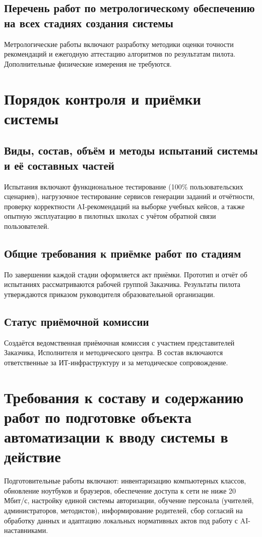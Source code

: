 \documentclass[14pt,a4paper]{extarticle}
\begin{document}
\subsection{Перечень работ по метрологическому обеспечению на всех стадиях создания системы}
Метрологические работы включают разработку методики оценки точности рекомендаций и ежегодную аттестацию алгоритмов по результатам пилота. Дополнительные физические измерения не требуются.

\section{Порядок контроля и приёмки системы}
\subsection{Виды, состав, объём и методы испытаний системы и её составных частей}
Испытания включают функциональное тестирование (100\% пользовательских сценариев), нагрузочное тестирование сервисов генерации заданий и отчётности, проверку корректности AI-рекомендаций на выборке учебных кейсов, а также опытную эксплуатацию в пилотных школах с учётом обратной связи пользователей.

\subsection{Общие требования к приёмке работ по стадиям}
По завершении каждой стадии оформляется акт приёмки. Прототип и отчёт об испытаниях рассматриваются рабочей группой Заказчика. Результаты пилота утверждаются приказом руководителя образовательной организации.

\subsection{Статус приёмочной комиссии}
Создаётся ведомственная приёмочная комиссия с участием представителей Заказчика, Исполнителя и методического центра. В состав включаются ответственные за ИТ-инфраструктуру и за методическое сопровождение.

\section{Требования к составу и содержанию работ по подготовке объекта автоматизации к вводу системы в действие}
Подготовительные работы включают: инвентаризацию компьютерных классов, обновление ноутбуков и браузеров, обеспечение доступа к сети не ниже 20 Мбит/с, настройку единой системы авторизации, обучение персонала (учителей, администраторов, методистов), информирование родителей, сбор согласий на обработку данных и адаптацию локальных нормативных актов под работу с AI-наставниками.
\end{document}
